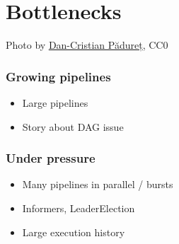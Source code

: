 \documentclass[aspectratio=169,11pt,hyperref={colorlinks=true}]{beamer}
\begin{document}
\section{Bottlenecks}
\begin{sectionwithpicrx}{Photo by \href{https://unsplash.com/@dancristianp}{\underline{Dan-Cristian Pădureț}}, CC0}
\end{sectionwithpicrx}

\begin{grayframe}
  \frametitle{Growing pipelines}
  \begin{itemize}
    \item Large pipelines
    \item Story about DAG issue
  \end{itemize}
\end{grayframe}

\begin{grayframe}
  \frametitle{Under pressure}
  \begin{itemize}
    \item Many pipelines in parallel / bursts
    \item Informers, LeaderElection
    \item Large execution history
  \end{itemize}
\end{grayframe}
\end{document}
